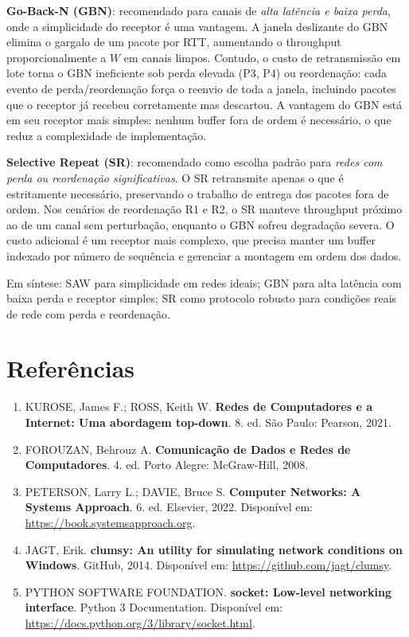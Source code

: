 \documentclass[12pt,a4paper]{article}
\begin{document}
\noindent \textbf{Go-Back-N (GBN)}: recomendado para canais de \emph{alta latência e baixa perda}, onde a simplicidade do receptor é uma vantagem. A janela deslizante do GBN elimina o gargalo de um pacote por RTT, aumentando o throughput proporcionalmente a $W$ em canais limpos. Contudo, o custo de retransmissão em lote torna o GBN ineficiente sob perda elevada (P3, P4) ou reordenação: cada evento de perda/reordenação força o reenvio de toda a janela, incluindo pacotes que o receptor já recebeu corretamente mas descartou. A vantagem do GBN está em seu receptor mais simples: nenhum buffer fora de ordem é necessário, o que reduz a complexidade de implementação.

\noindent \textbf{Selective Repeat (SR)}: recomendado como escolha padrão para \emph{redes com perda ou reordenação significativas}. O SR retransmite apenas o que é estritamente necessário, preservando o trabalho de entrega dos pacotes fora de ordem. Nos cenários de reordenação R1 e R2, o SR manteve throughput próximo ao de um canal sem perturbação, enquanto o GBN sofreu degradação severa. O custo adicional é um receptor mais complexo, que precisa manter um buffer indexado por número de sequência e gerenciar a montagem em ordem dos dados.

Em síntese: SAW para simplicidade em redes ideais; GBN para alta latência com baixa perda e receptor simples; SR como protocolo robusto para condições reais de rede com perda e reordenação.
\section*{Referências}

\begin{enumerate}
  \item KUROSE, James F.; ROSS, Keith W. \textbf{Redes de Computadores e a Internet: Uma abordagem top-down}. 8. ed. São Paulo: Pearson, 2021.
  \item FOROUZAN, Behrouz A. \textbf{Comunicação de Dados e Redes de Computadores}. 4. ed. Porto Alegre: McGraw-Hill, 2008.
  \item PETERSON, Larry L.; DAVIE, Bruce S. \textbf{Computer Networks: A Systems Approach}. 6. ed. Elsevier, 2022. Disponível em: \url{https://book.systemsapproach.org}.
  \item JAGT, Erik. \textbf{clumsy: An utility for simulating network conditions on Windows}. GitHub, 2014. Disponível em: \url{https://github.com/jagt/clumsy}.
  \item PYTHON SOFTWARE FOUNDATION. \textbf{socket: Low-level networking interface}. Python 3 Documentation. Disponível em: \url{https://docs.python.org/3/library/socket.html}.
\end{enumerate}
\end{document}
